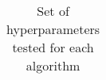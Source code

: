\begin{table}[ht]
\begin{tabular}{lrl}
\hline
\end{tabular}
\caption{Set of hyperparameters tested for each algorithm} \label{tab:hyperparams}
\end{table}
